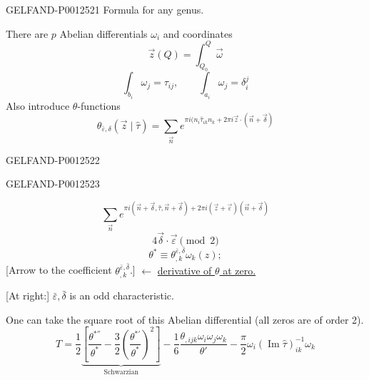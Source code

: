 \begin{GelfandAdjacentEvidence}{GELFAND-P001252}{1}
Formula for any genus.

There are $p$ Abelian differentials $\omega_i$ and coordinates
\begin{equation*}
\vec z(Q)=\int_{Q_0}^{Q}\vec\omega\tag{26}
\end{equation*}
\begin{equation*}
\int_{b_i}\omega_j=\tau_{ij},\qquad
\int_{a_i}\omega_j=\delta_i^j\tag{27}
\end{equation*}
Also introduce $\theta$-functions
\begin{equation*}
\theta_{\bar\varepsilon,\delta}(\vec z\mid\hat\tau)
=\sum_{\vec n}e^{\pi i\bigl(n_i\hat\tau_{ik}n_k
+2\pi i\vec z\cdot(\vec n+\vec\delta)}
\end{equation*}
\end{GelfandAdjacentEvidence}
\begin{GelfandAdjacentEvidence}{GELFAND-P001252}{2}

\end{GelfandAdjacentEvidence}
\begin{GelfandAdjacentEvidence}{GELFAND-P001252}{3}

\begin{equation*}
\sum_{\vec n}e^{\pi i(\vec n+\vec\delta,\hat\tau,\vec n+\vec\delta)
+2\pi i(\vec z+\vec\varepsilon)(\vec n+\vec\delta)}
\end{equation*}
\begin{equation*}
4\vec\delta\cdot\vec\varepsilon\pmod 2
\end{equation*}
\begin{equation*}
\theta^*\equiv\theta^{\bar\varepsilon,\bar\delta}_{,k}\omega_k(z);
\end{equation*}
[Arrow to the coefficient $\theta^{\bar\varepsilon,\bar\delta}_{,k}$.]
$\longleftarrow$ \underline{derivative of $\theta$ at zero.}

[At right:] $\bar\varepsilon,\bar\delta$ is an odd characteristic.

One can take the square root of this Abelian differential (all zeros are of order 2).
\begin{equation*}
T=\frac12
\underbrace{\left[\frac{\theta^{*''}}{\theta^*}
-\frac32\left(\frac{\theta^{*'}}{\theta^*}\right)^2\right]}_{\text{Schwarzian}}
-\frac16\frac{\theta_{,ijk}\omega_i\omega_j\omega_k}{\theta'}
-\frac\pi2\omega_i(\operatorname{Im}\hat\tau)^{-1}_{ik}\omega_k
\tag{28}
\end{equation*}
\end{GelfandAdjacentEvidence}


